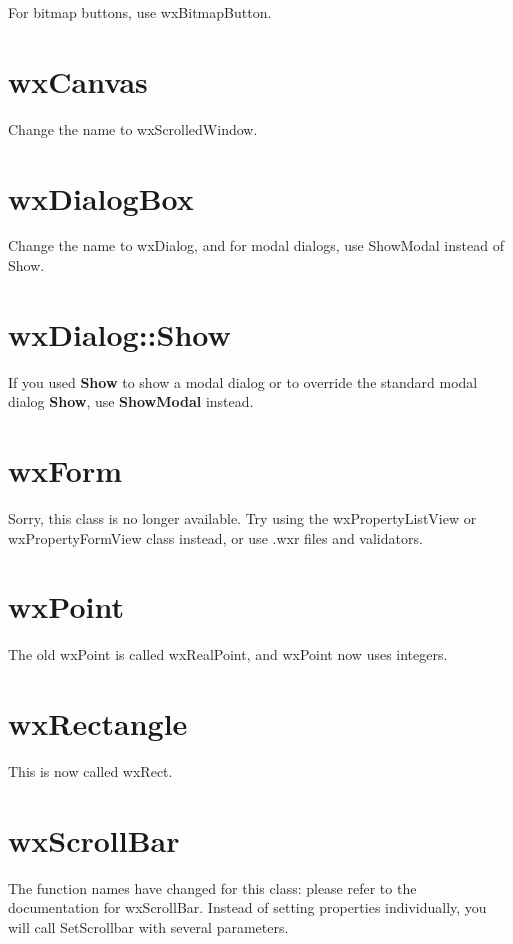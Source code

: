For bitmap buttons, use wxBitmapButton.

\section{wxCanvas}

Change the name to wxScrolledWindow.

\section{wxDialogBox}

Change the name to wxDialog, and for modal dialogs, use ShowModal instead of Show.

\section{wxDialog::Show}

If you used {\bf Show} to show a modal dialog or to override the standard
modal dialog {\bf Show}, use {\bf ShowModal} instead.



\section{wxForm}

Sorry, this class is no longer available. Try using the wxPropertyListView or wxPropertyFormView class
instead, or use .wxr files and validators.

\section{wxPoint}

The old wxPoint is called wxRealPoint, and wxPoint now uses integers.

\section{wxRectangle}

This is now called wxRect.

\section{wxScrollBar}

The function names have changed for this class: please refer to the documentation for wxScrollBar. Instead
of setting properties individually, you will call SetScrollbar with several parameters.

